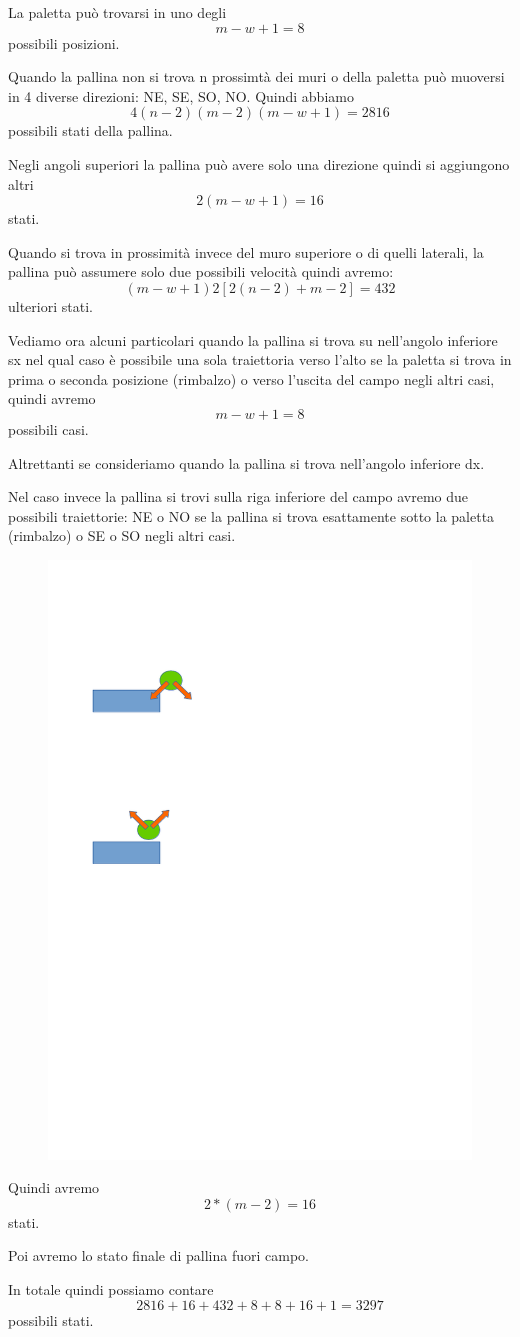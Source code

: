\documentclass[a4paper,11pt]{article}
\begin{document}
La paletta può trovarsi in uno degli
\[m - w + 1 = 8\] possibili posizioni.

Quando la pallina non si trova n prossimtà dei muri o della paletta
può muoversi in 4 diverse direzioni: NE, SE, SO, NO.
Quindi abbiamo
\[ 4 (n-2)(m-2) (m - w + 1) = 2816 \]
possibili stati della pallina.

Negli angoli superiori la pallina può avere solo una direzione quindi
si aggiungono altri 
\[
	2 (m -w +1) = 16
\] stati.

Quando si trova in prossimità invece del muro superiore o di quelli laterali, la pallina può assumere solo due possibili velocità quindi avremo:
\[ (m -w + 1) 2 [ 2 (n - 2) + m - 2] = 432 \]
ulteriori stati.

Vediamo ora alcuni particolari quando la pallina si trova su nell'angolo
inferiore sx nel qual caso è possibile una sola traiettoria verso l'alto
se la paletta si trova in prima o seconda posizione (rimbalzo) o verso 
l'uscita del campo negli altri casi, quindi avremo
\[ m-w+1 = 8\] possibili casi.

Altrettanti se consideriamo quando la pallina si trova nell'angolo inferiore dx.

Nel caso invece la pallina si trovi sulla riga inferiore del campo avremo due possibili traiettorie: NE o  NO se la pallina si trova esattamente sotto la paletta (rimbalzo) o SE o SO negli altri casi.
\begin{figure}
\centering
\includegraphics[width=0.7\linewidth]{wall1}
\caption{}
\label{fig:wall1}
\end{figure}

Quindi avremo
\[ 2 * (m - 2) = 16 \] stati.

Poi avremo lo stato finale di pallina fuori campo.

In totale quindi possiamo contare
\[
	2816 + 16 + 432 + 8 + 8 + 16 + 1 = 3297
\] possibili stati.
\end{document}
